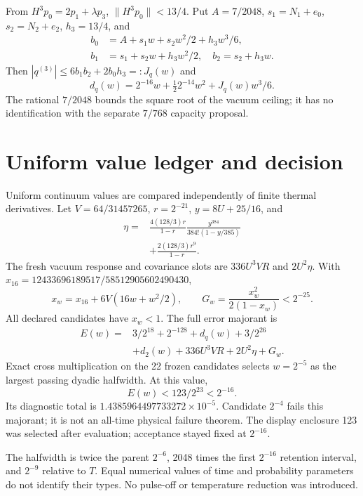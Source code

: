 \documentclass[a4paper,journal]{IEEEtran}
\begin{document}
From $H^3p_0=2p_1+\lambda p_3$, $\|H^3p_0\|<13/4$. Put $A=7/2048$, $s_1=N_1+e_0$, $s_2=N_2+e_2$, $h_3=13/4$, and
\begin{align}
b_0&=A+s_1w+s_2w^2/2+h_3w^3/6,\nonumber\\
b_1&=s_1+s_2w+h_3w^2/2,\quad b_2=s_2+h_3w.\nonumber
\end{align}
Then $|q^{(3)}|\le6b_1b_2+2b_0h_3=:J_q(w)$ and
\begin{equation}d_q(w)=2^{-16}w+\tfrac12 2^{-14}w^2+J_q(w)w^3/6.\end{equation}
The rational $7/2048$ bounds the square root of the vacuum ceiling; it has no identification with the separate $7/768$ capacity proposal.
\section{Uniform value ledger and decision}
Uniform continuum values are compared independently of finite thermal derivatives. Let $V=64/31457265$, $r=2^{-21}$, $y=8U+25/16$, and
\begin{align}
\eta={}&\frac{4(128/3)r}{1-r}\frac{y^{384}}{384!(1-y/385)}\nonumber\\&+\frac{2(128/3)r^9}{1-r}.
\end{align}
The fresh vacuum response and covariance slots are $336U^3VR$ and $2U^2\eta$. With $x_{16}=12433696189517/58512905602490430$,
\begin{equation}x_w=x_{16}+6V(16w+w^2/2),\qquad G_w=\frac{x_w^2}{2(1-x_w)}<2^{-25}.
\end{equation}
All declared candidates have $x_w<1$. The full error majorant is
\begin{align}
E(w)={}&3/2^{18}+2^{-128}+d_q(w)+3/2^{26}\nonumber\\&+d_2(w)+336U^3VR+2U^2\eta+G_w.\label{ledger}
\end{align}
Exact cross multiplication on the 22 frozen candidates selects $w=2^{-5}$ as the largest passing dyadic halfwidth. At this value,
\begin{equation}E(w)<123/2^{23}<2^{-16}.
\end{equation}
Its diagnostic total is $1.4385964497733272\times10^{-5}$. Candidate $2^{-4}$ fails this majorant; it is not an all-time physical failure theorem. The display enclosure 123 was selected after evaluation; acceptance stayed fixed at $2^{-16}$.

The halfwidth is twice the parent $2^{-6}$, 2048 times the first $2^{-16}$ retention interval, and $2^{-9}$ relative to $T$. Equal numerical values of time and probability parameters do not identify their types. No pulse-off or temperature reduction was introduced.
\end{document}
